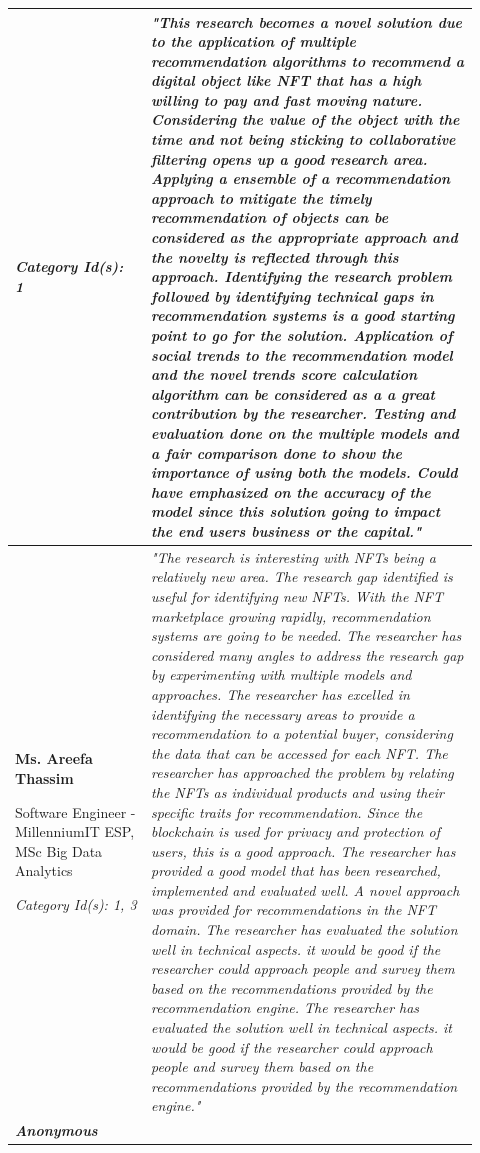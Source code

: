 \begin{longtable}{|p{0.27\linewidth}|p{0.655\linewidth}|}
\textit{Category Id(s): 1}
 &
\textit{"This research becomes a novel solution due to the application of multiple recommendation algorithms to recommend a digital object like NFT that has a high willing to pay and fast moving nature. Considering the value of the object with the time and not being sticking to collaborative filtering opens up a good research area. Applying a ensemble of a recommendation approach to mitigate the timely recommendation of objects can be considered as the appropriate approach and the novelty is reflected through this approach. Identifying the research problem followed by identifying technical gaps in recommendation systems is a good starting point to go for the solution. Application of social trends to the recommendation model and the novel trends score calculation algorithm can be considered as a a great contribution by the researcher. Testing and evaluation done on the multiple models and a fair comparison done to show the importance of using both the models.
Could have emphasized on the accuracy of the model since this solution going to impact the end users business or the capital."}
\\
\hline
\textbf{Ms. Areefa Thassim}

Software Engineer - MillenniumIT ESP,
MSc Big Data Analytics

\textit{Category Id(s): 1, 3}
 & 
 \textit{"The research is interesting with NFTs being a relatively new area. The research gap identified is useful for identifying new NFTs. With the NFT marketplace growing rapidly, recommendation systems are going to be needed. The researcher has considered many angles to address the research gap by experimenting with multiple models and approaches. The researcher has excelled in identifying the necessary areas to provide a recommendation to a potential buyer, considering the data that can be accessed for each NFT. The researcher has approached the problem by relating the NFTs as individual products and using their specific traits for recommendation. Since the blockchain is used for privacy and protection of users, this is a good approach. The researcher has provided a good model that has been researched, implemented and evaluated well. A novel approach was provided for recommendations in the NFT domain. The researcher has evaluated the solution well in technical aspects. it would be good if the researcher could approach people and survey them based on the recommendations provided by the recommendation engine. The researcher has evaluated the solution well in technical aspects. it would be good if the researcher could approach people and survey them based on the recommendations provided by the recommendation engine."}
 \\
\hline
\textbf{\textit{Anonymous}}


\end{longtable}

